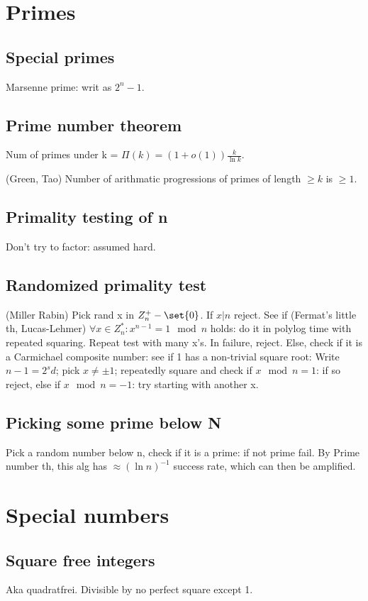 \documentclass[10pt]{amsart}
\begin{document}
\section{Primes}
\subsection{Special primes}
Marsenne prime: writ as $2^{n}-1$.

\subsection{Prime number theorem}
Num of primes under k = $\Pi(k) = (1 + o(1))\frac{k}{\ln k}$. \why

(Green, Tao) Number of arithmatic progressions of primes of length $\geq k$ is $\geq 1$.

\subsection{Primality testing of n}
Don't try to factor: assumed hard.

\subsection{Randomized primality test}
(Miller Rabin) Pick rand x in $Z^{+}_{n} - \set{0}$. If $x | n$ reject. See if (Fermat's little th, Lucas-Lehmer) $\forall x \in Z_{n}^{*}: x^{n-1} = 1 \mod n$ holds: do it in polylog time with repeated squaring. Repeat test with many x's. In failure, reject. Else, check if it is a Carmichael composite number: see if 1 has a non-trivial square root: Write $n-1=2^{s}d$; pick $x\neq \pm 1$; repeatedly square and check if $x \mod n = 1$: if so reject, else if $x \mod n = -1$: try starting with another x.

\subsection{Picking some prime below N}
Pick a random number below n, check if it is a prime: if not prime fail. By Prime number th, this alg has $\approx (\ln n)^{-1}$ success rate, which can then be amplified.

\section{Special numbers}
\subsection{Square free integers}
Aka quadratfrei. Divisible by no perfect square except 1.
\end{document}

